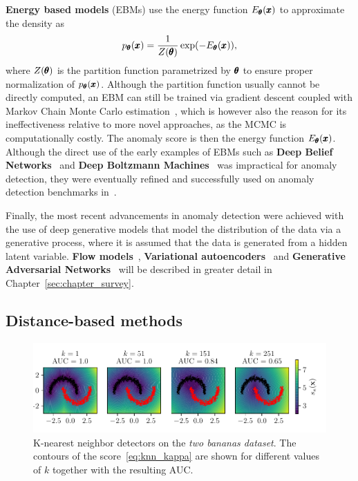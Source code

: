 \textbf{Energy based models} (EBMs) use the energy function $E_{\pmb{{\theta}}}(\pmb{{x}})$ to approximate the density as
\begin{equation} \label{eq:ebm}
	p_{\pmb{{\theta}}}(\pmb{{x}}) =  \frac{1}{Z(\pmb{{\theta}})} \exp (- E_{\pmb{{\theta}}}(\pmb{{x}})),
\end{equation}
where $Z(\pmb{{\theta}})$ is the partition function parametrized by $\pmb{{\theta}}$ to ensure proper normalization of $p_{\pmb{{\theta}}}(\pmb{{x}})$. Although the partition function usually cannot be directly computed, an EBM can still be trained via gradient descent coupled with Markov Chain Monte Carlo estimation~\cite{hinton2002training}, which is however also the reason for its ineffectiveness relative to more novel approaches, as the MCMC is computationally costly. The anomaly score is then the energy function $E_{\pmb{{\theta}}}(\pmb{{x}})$. Although the direct use of the early examples of EBMs such as \textbf{Deep Belief Networks}~\cite{hinton2006fast} and \textbf{Deep Boltzmann Machines}~\cite{salakhutdinov2010efficient} was impractical for anomaly detection, they were eventually refined and successfully used on anomaly detection benchmarks in~\cite{zhai2016deep}. 

Finally, the most recent advancements in anomaly detection were achieved with the use of deep generative models that model the distribution of the data via a generative process, where it is assumed that the data is generated from a hidden latent variable. \textbf{Flow models}~\cite{dinh2014nice}, \textbf{Variational autoencoders}~\cite{kingma2013vae} and \textbf{Generative Adversarial Networks}~\cite{goodfellow2014gan}  will be described in greater detail in Chapter~\ref{sec:chapter_survey}.

\subsection{Distance-based methods} \label{sec:distance_methods}

\begin{figure}
\begin{centering}
\includegraphics[scale=0.98]{data/chapter_intro/knn_examples.pdf}
\end{centering}
\caption{K-nearest neighbor detectors on the \textit{two bananas dataset}. The contours of the score~\eqref{eq:knn_kappa} are shown for different values of $k$ together with the resulting AUC.}
\label{fig:knn_examples}
\end{figure}

